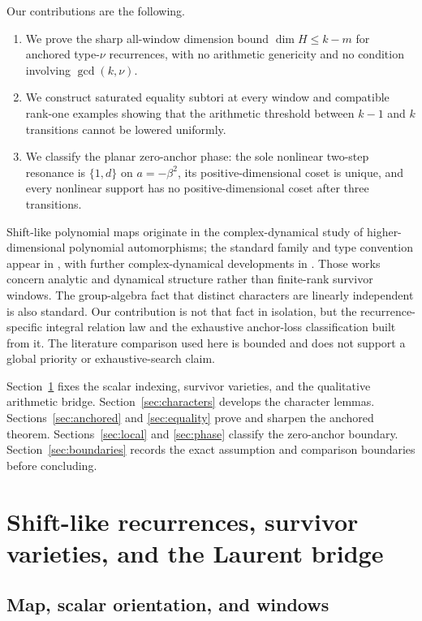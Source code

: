 \documentclass[11pt]{article}
\theoremstyle{definition}
\theoremstyle{remark}
\begin{document}
Our contributions are the following.
\begin{enumerate}[label=(\roman*)]
\item We prove the sharp all-window dimension bound $\dim H\leq k-m$ for anchored type-$\nu$ recurrences, with no arithmetic genericity and no condition involving $\gcd(k,\nu)$.
\item We construct saturated equality subtori at every window and compatible rank-one examples showing that the arithmetic threshold between $k-1$ and $k$ transitions cannot be lowered uniformly.
\item We classify the planar zero-anchor phase: the sole nonlinear two-step resonance is $\{1,d\}$ on $a=-\beta^2$, its positive-dimensional coset is unique, and every nonlinear support has no positive-dimensional coset after three transitions.
\end{enumerate}

Shift-like polynomial maps originate in the complex-dynamical study of higher-dimensional polynomial automorphisms; the standard family and type convention appear in \cite{BedfordPambuccian1998}, with further complex-dynamical developments in \cite{Bera2018,BeraVerma2013}.  Those works concern analytic and dynamical structure rather than finite-rank survivor windows.  The group-algebra fact that distinct characters are linearly independent is also standard.  Our contribution is not that fact in isolation, but the recurrence-specific integral relation law and the exhaustive anchor-loss classification built from it.  The literature comparison used here is bounded and does not support a global priority or exhaustive-search claim.

Section~\ref{sec:setup} fixes the scalar indexing, survivor varieties, and the qualitative arithmetic bridge.  Section~\ref{sec:characters} develops the character lemmas.  Sections~\ref{sec:anchored} and \ref{sec:equality} prove and sharpen the anchored theorem.  Sections~\ref{sec:local} and \ref{sec:phase} classify the zero-anchor boundary.  Section~\ref{sec:boundaries} records the exact assumption and comparison boundaries before concluding.

\section{Shift-like recurrences, survivor varieties, and the Laurent bridge}
\label{sec:setup}

\subsection{Map, scalar orientation, and windows}
\end{document}
